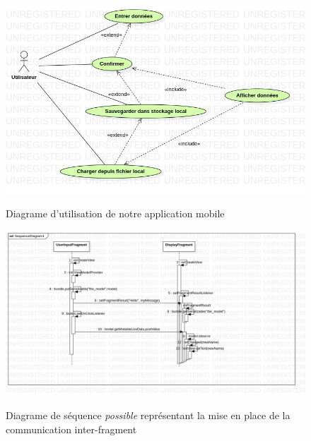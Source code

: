 \documentclass[a4paper]{article}
\begin{document}
\begin{multicols}{2}
        \begin{figure}
            \centering
            \caption{Diagrame d'utilisation de notre application mobile}
            \includegraphics[width=.8\textwidth]{jpg/useCase}
            \label{fig:useCase}
        \end{figure}
        \begin{figure}
            \centering
            \caption{Diagrame de séquence \emph{possible} représentant la mise en place de la communication inter-fragment}
            \includegraphics[width=.8\textwidth]{jpg/sequence}
            \label{fig:useCase}
        \end{figure}
    \end{multicols}
\end{document}
